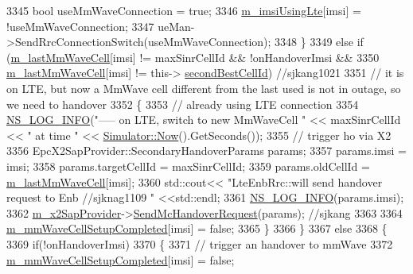 \begin{DoxyCode}
3345         \textcolor{keywordtype}{bool} useMmWaveConnection = \textcolor{keyword}{true};
3346         \hyperlink{classns3_1_1LteEnbRrc_a99427e888b10d095491e72bf062511db}{m\_imsiUsingLte}[imsi] = !useMmWaveConnection;
3347         ueMan->SendRrcConnectionSwitch(useMmWaveConnection);
3348       \}
3349       \textcolor{keywordflow}{else} \textcolor{keywordflow}{if} (\hyperlink{classns3_1_1LteEnbRrc_a0d7b04f0383b0dc3f6a7360b87cbaeee}{m\_lastMmWaveCell}[imsi] != maxSinrCellId && !onHandoverImsi &&
3350                   \hyperlink{classns3_1_1LteEnbRrc_a0d7b04f0383b0dc3f6a7360b87cbaeee}{m\_lastMmWaveCell}[imsi] != this->
      \hyperlink{classns3_1_1LteEnbRrc_ad1ecf3d722f64bf11fbc6c4ff1903069}{secondBestCellId})  \textcolor{comment}{//sjkang1021}
3351       \textcolor{comment}{// it is on LTE, but now a MmWave cell different from the last used is not in outage, so we need to
       handover}
3352       \{
3353         \textcolor{comment}{// already using LTE connection}
3354         \hyperlink{group__logging_gafbd73ee2cf9f26b319f49086d8e860fb}{NS\_LOG\_INFO}(\textcolor{stringliteral}{"----- on LTE, switch to new MmWaveCell "} << maxSinrCellId << \textcolor{stringliteral}{" at time "} <<
       \hyperlink{classns3_1_1Simulator_ac3178fa975b419f7875e7105be122800}{Simulator::Now}().GetSeconds());
3355         \textcolor{comment}{// trigger ho via X2}
3356         EpcX2SapProvider::SecondaryHandoverParams params;
3357         params.imsi = imsi;
3358         params.targetCellId = maxSinrCellId;
3359         params.oldCellId = \hyperlink{classns3_1_1LteEnbRrc_a0d7b04f0383b0dc3f6a7360b87cbaeee}{m\_lastMmWaveCell}[imsi];
3360         std::cout<< \textcolor{stringliteral}{"LteEnbRrc::will send handover request to Enb //sjknag1109 "} <<std::endl;
3361          \hyperlink{group__logging_gafbd73ee2cf9f26b319f49086d8e860fb}{NS\_LOG\_INFO}(params.imsi);
3362         \hyperlink{classns3_1_1LteEnbRrc_ae8dc75f4f6f63b7736d86204a4beb415}{m\_x2SapProvider}->\hyperlink{classns3_1_1EpcX2SapProvider_a419d10f3f7f1808938a53439bed4f9eb}{SendMcHandoverRequest}(params); \textcolor{comment}{//sjkang}
3363 
3364         \hyperlink{classns3_1_1LteEnbRrc_ad19d6f4c123115e1d13e34609781ab20}{m\_mmWaveCellSetupCompleted}[imsi] = \textcolor{keyword}{false};
3365       \}  
3366     \}
3367     \textcolor{keywordflow}{else}
3368     \{
3369       \textcolor{keywordflow}{if}(!onHandoverImsi)
3370       \{
3371         \textcolor{comment}{// trigger an handover to mmWave}
3372         \hyperlink{classns3_1_1LteEnbRrc_ad19d6f4c123115e1d13e34609781ab20}{m\_mmWaveCellSetupCompleted}[imsi] = \textcolor{keyword}{false};

\end{DoxyCode}
